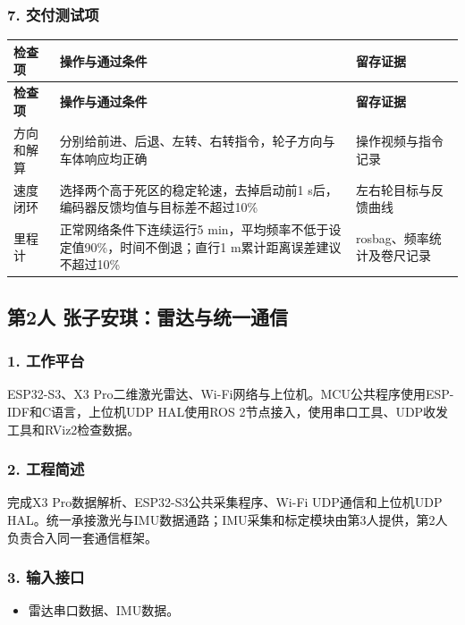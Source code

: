 \documentclass[UTF8,fontset=fandol,11pt,a4paper]{ctexart}
\begin{document}
\subsubsection*{7. 交付测试项}
{\small
\begin{longtable}{|>{\raggedright\arraybackslash}p{}|>{\raggedright\arraybackslash}p{}|>{\raggedright\arraybackslash}p{}|}
\hline
\rowcolor{TableHead} \textbf{检查项} & \textbf{操作与通过条件} & \textbf{留存证据} \\ \hline
\endfirsthead
\hline
\rowcolor{TableHead} \textbf{检查项} & \textbf{操作与通过条件} & \textbf{留存证据} \\ \hline
\endhead
\endfoot
\endlastfoot
方向和解算 & 分别给前进、后退、左转、右转指令，轮子方向与车体响应均正确 & 操作视频与指令记录 \\ \hline
速度闭环 & 选择两个高于死区的稳定轮速，去掉启动前1 s后，编码器反馈均值与目标差不超过10\% & 左右轮目标与反馈曲线 \\ \hline
里程计 & 正常网络条件下连续运行5 min，平均频率不低于设定值90\%，时间不倒退；直行1 m累计距离误差建议不超过10\% & rosbag、频率统计及卷尺记录 \\ \hline
\end{longtable}
}

\subsection{第2人 张子安琪：雷达与统一通信}
\subsubsection*{1. 工作平台}
ESP32-S3、X3 Pro二维激光雷达、Wi-Fi网络与上位机。MCU公共程序使用ESP-IDF和C语言，上位机UDP HAL使用ROS 2节点接入，使用串口工具、UDP收发工具和RViz2检查数据。

\subsubsection*{2. 工程简述}
完成X3 Pro数据解析、ESP32-S3公共采集程序、Wi-Fi UDP通信和上位机UDP HAL。统一承接激光与IMU数据通路；IMU采集和标定模块由第3人提供，第2人负责合入同一套通信框架。

\subsubsection*{3. 输入接口}
\begin{itemize}
\item 雷达串口数据、IMU数据。
\end{itemize}
\end{document}
